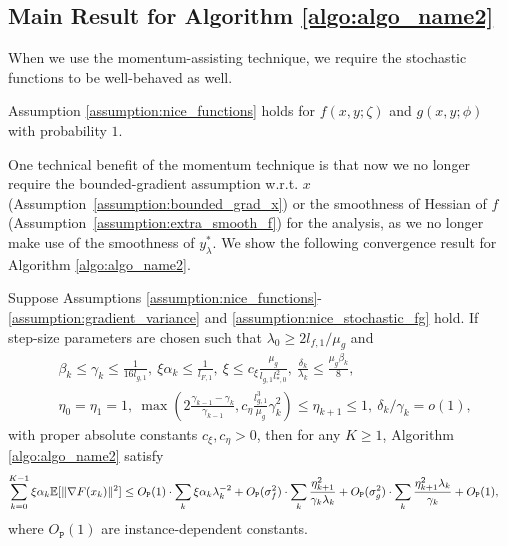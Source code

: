 \subsection{Main Result for Algorithm \ref{algo:algo_name2}}
When we use the momentum-assisting technique, we require the stochastic functions to be well-behaved as well.
\begin{assumption}
    \label{assumption:nice_stochastic_fg}
    Assumption \ref{assumption:nice_functions} holds for $f(x,y;\zeta)$ and $g(x,y;\phi)$ with probability $1$. 
\end{assumption}
One technical benefit of the momentum technique is that now we no longer require the bounded-gradient assumption w.r.t. $x$ (Assumption~\ref{assumption:bounded_grad_x}) or the smoothness of Hessian of $f$ (Assumption~\ref{assumption:extra_smooth_f}) for the analysis, as we no longer make use of the smoothness of $y_\lambda^*$.
We show the following convergence result for Algorithm \ref{algo:algo_name2}.
\begin{theorem}
    \label{theorem:general_momentum}
    Suppose Assumptions \ref{assumption:nice_functions}-\ref{assumption:gradient_variance} and \ref{assumption:nice_stochastic_fg} hold. If step-size parameters are chosen such that $\lambda_0 \ge 2l_{f,1} / \mu_g$ and 
    \begin{subequations}
        \label{eq:step_size_theorem_momentum}
        \begin{align}
        & \beta_k \le \gamma_k \le \frac{1}{16 l_{g,1}}, \ \xi \alpha_k \le \frac{1}{l_{F,1}},  \ \xi \le c_\xi \frac{\mu_g}{l_{g,1} l_{*,0}^2}, \ \frac{\delta_k}{\lambda_k} \le \frac{\mu_g \beta_k}{8} ,\label{eq:step_size_theorem_momentum_a} \\
            & \eta_0 = \eta_1 = 1, \ \max \left( 2\frac{\gamma_{k-1} - \gamma_k}{\gamma_{k-1}}, c_\eta \frac{l_{g,1}^3}{\mu_g} \gamma_k^2 \right) \le \eta_{k+1} \le 1, \ \delta_k / \gamma_k = o(1), \label{eq:step_size_theorem_momentum_b}
        \end{align}
    \end{subequations}
    with proper absolute constants $c_{\xi}, c_{\eta} > 0$, then for any $K \ge 1$, Algorithm \ref{algo:algo_name2} satisfy
    \begin{align*}
        \sum_{k=0}^{K-1} \xi \alpha_k \mathbb{E}[\|\nabla F(x_k)\|^2] &\le O_{\texttt{P}} (1) \cdot \sum_{k} \xi\alpha_k\lambda_k^{-2} + O_{\texttt{P}}(\sigma_f^2) \cdot \sum_{k} \frac{\eta_{k+1}^2}{\gamma_k \lambda_k} + O_{\texttt{P}}(\sigma_g^2) \cdot \sum_{k} \frac{\eta_{k+1}^2 \lambda_k}{\gamma_k} + O_{\texttt{P}} (1), 
    \end{align*}
    where $O_{\texttt{P}}(1)$ are instance-dependent constants. 
\end{theorem}
